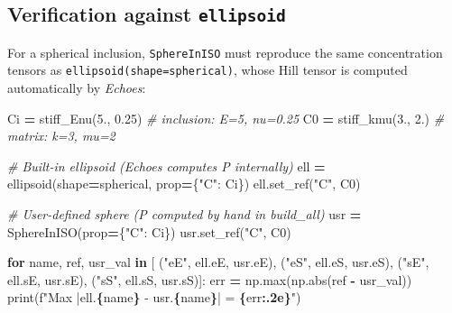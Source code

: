 \documentclass[
  a4paper,
  numbers=noendperiod,
  DIV=12]{scrreprt}
\newenvironment{Shaded}{\begin{snugshade}}{\end{snugshade}}
\newcommand{\BuiltInTok}[1]{#1}
\newcommand{\CommentTok}[1]{\textcolor[rgb]{0.56,0.35,0.01}{\textit{#1}}}
\newcommand{\ControlFlowTok}[1]{\textcolor[rgb]{0.13,0.29,0.53}{\textbf{#1}}}
\newcommand{\FloatTok}[1]{\textcolor[rgb]{0.00,0.00,0.81}{#1}}
\newcommand{\KeywordTok}[1]{\textcolor[rgb]{0.13,0.29,0.53}{\textbf{#1}}}
\newcommand{\NormalTok}[1]{#1}
\newcommand{\OperatorTok}[1]{\textcolor[rgb]{0.81,0.36,0.00}{\textbf{#1}}}
\newcommand{\SpecialCharTok}[1]{\textcolor[rgb]{0.81,0.36,0.00}{\textbf{#1}}}
\newcommand{\SpecialStringTok}[1]{\textcolor[rgb]{0.31,0.60,0.02}{#1}}
\newcommand{\StringTok}[1]{\textcolor[rgb]{0.31,0.60,0.02}{#1}}
\begin{document}
\subsection{\texorpdfstring{Verification against
\texttt{ellipsoid}}{Verification against ellipsoid}}\label{verification-against-ellipsoid}

For a spherical inclusion, \texttt{SphereInISO} must reproduce the same
concentration tensors as \texttt{ellipsoid(shape=spherical)}, whose Hill
tensor is computed automatically by \emph{Echoes}:

\begin{Shaded}
\begin{Highlighting}[]
\NormalTok{Ci }\OperatorTok{=}\NormalTok{ stiff\_Enu(}\FloatTok{5.}\NormalTok{, }\FloatTok{0.25}\NormalTok{)    }\CommentTok{\# inclusion: E=5, nu=0.25}
\NormalTok{C0 }\OperatorTok{=}\NormalTok{ stiff\_kmu(}\FloatTok{3.}\NormalTok{, }\FloatTok{2.}\NormalTok{)      }\CommentTok{\# matrix: k=3, mu=2}

\CommentTok{\# Built{-}in ellipsoid (Echoes computes P internally)}
\NormalTok{ell }\OperatorTok{=}\NormalTok{ ellipsoid(shape}\OperatorTok{=}\NormalTok{spherical, prop}\OperatorTok{=}\NormalTok{\{}\StringTok{"C"}\NormalTok{: Ci\})}
\NormalTok{ell.set\_ref(}\StringTok{"C"}\NormalTok{, C0)}

\CommentTok{\# User{-}defined sphere (P computed by hand in build\_all)}
\NormalTok{usr }\OperatorTok{=}\NormalTok{ SphereInISO(prop}\OperatorTok{=}\NormalTok{\{}\StringTok{"C"}\NormalTok{: Ci\})}
\NormalTok{usr.set\_ref(}\StringTok{"C"}\NormalTok{, C0)}

\ControlFlowTok{for}\NormalTok{ name, ref, usr\_val }\KeywordTok{in}\NormalTok{ [}
\NormalTok{        (}\StringTok{"eE"}\NormalTok{, ell.eE, usr.eE),}
\NormalTok{        (}\StringTok{"eS"}\NormalTok{, ell.eS, usr.eS),}
\NormalTok{        (}\StringTok{"sE"}\NormalTok{, ell.sE, usr.sE),}
\NormalTok{        (}\StringTok{"sS"}\NormalTok{, ell.sS, usr.sS)]:}
\NormalTok{    err }\OperatorTok{=}\NormalTok{ np.}\BuiltInTok{max}\NormalTok{(np.}\BuiltInTok{abs}\NormalTok{(ref }\OperatorTok{{-}}\NormalTok{ usr\_val))}
    \BuiltInTok{print}\NormalTok{(}\SpecialStringTok{f"Max |ell.}\SpecialCharTok{\{}\NormalTok{name}\SpecialCharTok{\}}\SpecialStringTok{ {-} usr.}\SpecialCharTok{\{}\NormalTok{name}\SpecialCharTok{\}}\SpecialStringTok{| = }\SpecialCharTok{\{}\NormalTok{err}\SpecialCharTok{:.2e\}}\SpecialStringTok{"}\NormalTok{)}
\end{Highlighting}
\end{Shaded}
\end{document}
